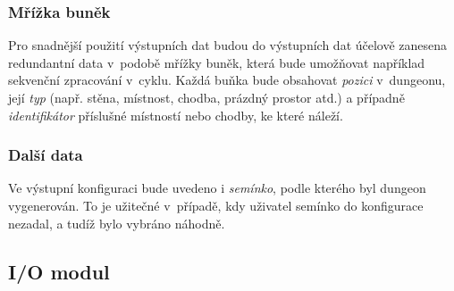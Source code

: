 \subsubsection{Mřížka buněk}
Pro snadnější použití výstupních dat budou do výstupních dat účelově zanesena redundantní data v~podobě mřížky buněk, která bude umožňovat například sekvenční zpracování v~cyklu.
Každá buňka bude obsahovat \textit{pozici} v~dungeonu, její \textit{typ} (např. stěna, místnost, chodba, prázdný prostor atd.) a případně \textit{identifikátor} příslušné místností nebo chodby, ke které náleží.

\subsubsection{Další data}
Ve výstupní konfiguraci bude uvedeno i \textit{semínko}, podle kterého byl dungeon vygenerován.
To je užitečné v~případě, kdy uživatel semínko do konfigurace nezadal, a tudíž bylo vybráno náhodně.


\subsection{I/O modul}


